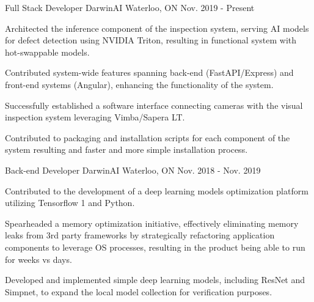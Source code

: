 

\begin{cventries}

  \cventry
    {Full Stack Developer} %
    {DarwinAI} %
    {Waterloo, ON} %
    {Nov. 2019 - Present} %
    {
      \begin{cvitems} %
        \item {Architected the inference component of the inspection system, serving AI models for defect detection using NVIDIA Triton, resulting in functional system with hot-swappable models.}
        \item {Contributed system-wide features spanning back-end (FastAPI/Express) and front-end systems (Angular), enhancing the functionality of the system.}
        \item {Successfully established a software interface connecting cameras with the visual inspection system leveraging Vimba/Sapera LT.}
        \item {Contributed to packaging and installation scripts for each component of the system resulting and faster and more simple installation process.}
      \end{cvitems}
    }

  \cventry
    {Back-end Developer} %
    {DarwinAI} %
    {Waterloo, ON} %
    {Nov. 2018 - Nov. 2019} %
    {
      \begin{cvitems} %
        \item {Contributed to the development of a deep learning models optimization platform utilizing Tensorflow 1 and Python.}
        \item {Spearheaded a memory optimization initiative, effectively eliminating memory leaks from 3rd party frameworks  by strategically refactoring application components to leverage OS processes, resulting in the product being able to run for weeks vs days.}
        \item {Developed and implemented simple deep learning models, including ResNet and Simpnet, to expand the local model collection for verification purposes.}
      \end{cvitems}
    }


\end{cventries}
